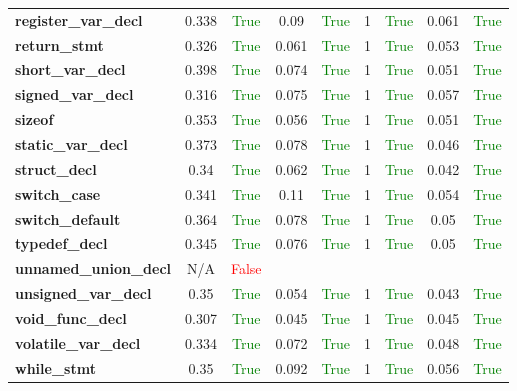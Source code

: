 \documentclass{article}
\begin{document}
\begin{xltabular}{\textwidth}{lcccccccc}
\textbf{{\fontsize{10}{12}\selectfont register\_var\_decl}}& 0.338&\textcolor{green}{True}& 0.09&\textcolor{green}{True}& 1&\textcolor{green}{True}& 0.061&\textcolor{green}{True} \\[0.5ex]
\textbf{{\fontsize{10}{12}\selectfont return\_stmt}}& 0.326&\textcolor{green}{True}& 0.061&\textcolor{green}{True}& 1&\textcolor{green}{True}& 0.053&\textcolor{green}{True} \\[0.5ex]
\textbf{{\fontsize{10}{12}\selectfont short\_var\_decl}}& 0.398&\textcolor{green}{True}& 0.074&\textcolor{green}{True}& 1&\textcolor{green}{True}& 0.051&\textcolor{green}{True} \\[0.5ex]
\textbf{{\fontsize{10}{12}\selectfont signed\_var\_decl}}& 0.316&\textcolor{green}{True}& 0.075&\textcolor{green}{True}& 1&\textcolor{green}{True}& 0.057&\textcolor{green}{True} \\[0.5ex]
\textbf{{\fontsize{10}{12}\selectfont sizeof}}& 0.353&\textcolor{green}{True}& 0.056&\textcolor{green}{True}& 1&\textcolor{green}{True}& 0.051&\textcolor{green}{True} \\[0.5ex]
\textbf{{\fontsize{10}{12}\selectfont static\_var\_decl}}& 0.373&\textcolor{green}{True}& 0.078&\textcolor{green}{True}& 1&\textcolor{green}{True}& 0.046&\textcolor{green}{True} \\[0.5ex]
\textbf{{\fontsize{10}{12}\selectfont struct\_decl}}& 0.34&\textcolor{green}{True}& 0.062&\textcolor{green}{True}& 1&\textcolor{green}{True}& 0.042&\textcolor{green}{True} \\[0.5ex]
\textbf{{\fontsize{10}{12}\selectfont switch\_case}}& 0.341&\textcolor{green}{True}& 0.11&\textcolor{green}{True}& 1&\textcolor{green}{True}& 0.054&\textcolor{green}{True} \\[0.5ex]
\textbf{{\fontsize{10}{12}\selectfont switch\_default}}& 0.364&\textcolor{green}{True}& 0.078&\textcolor{green}{True}& 1&\textcolor{green}{True}& 0.05&\textcolor{green}{True} \\[0.5ex]
\textbf{{\fontsize{10}{12}\selectfont typedef\_decl}}& 0.345&\textcolor{green}{True}& 0.076&\textcolor{green}{True}& 1&\textcolor{green}{True}& 0.05&\textcolor{green}{True} \\[0.5ex]
\textbf{{\fontsize{10}{12}\selectfont unnamed\_union\_decl}}& N/A&\textcolor{red}{False} \\[0.5ex]
\textbf{{\fontsize{10}{12}\selectfont unsigned\_var\_decl}}& 0.35&\textcolor{green}{True}& 0.054&\textcolor{green}{True}& 1&\textcolor{green}{True}& 0.043&\textcolor{green}{True} \\[0.5ex]
\textbf{{\fontsize{10}{12}\selectfont void\_func\_decl}}& 0.307&\textcolor{green}{True}& 0.045&\textcolor{green}{True}& 1&\textcolor{green}{True}& 0.045&\textcolor{green}{True} \\[0.5ex]
\textbf{{\fontsize{10}{12}\selectfont volatile\_var\_decl}}& 0.334&\textcolor{green}{True}& 0.072&\textcolor{green}{True}& 1&\textcolor{green}{True}& 0.048&\textcolor{green}{True} \\[0.5ex]
\textbf{{\fontsize{10}{12}\selectfont while\_stmt}}& 0.35&\textcolor{green}{True}& 0.092&\textcolor{green}{True}& 1&\textcolor{green}{True}& 0.056&\textcolor{green}{True} \\[0.5ex]
\bottomrule
\end{xltabular}
\end{document}
